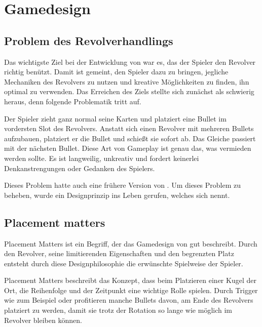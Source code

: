 
\section{Gamedesign}\label{sec:Gamedesign}

\renewcommand{\kapitelautor}{Autor: Philip Jankovic}


\subsection{Problem des Revolverhandlings}\label{subsec:gamedesignBehindBullets}

Das wichtigste Ziel bei der Entwicklung von \FF war es, das der Spieler den Revolver richtig benützt. Damit ist gemeint,
den Spieler dazu zu bringen, jegliche Mechaniken des Revolvers zu nutzen und kreative Möglichkeiten zu finden, ihn optimal zu verwenden.
Das Erreichen des Ziels stellte sich zunächst als schwierig heraus, denn folgende Problematik tritt auf.


Der Spieler zieht ganz normal seine Karten und platziert eine Bullet im vordersten Slot des Revolvers.
Anstatt sich einen Revolver mit mehreren Bullets aufzubauen, platziert er die Bullet und schießt sie sofort ab.
Das Gleiche passiert mit der nächsten Bullet. Diese Art von Gameplay ist genau das, was vermieden werden sollte.
Es ist langweilig, unkreativ und fordert keinerlei Denkanstrengungen oder Gedanken des Spielers.


Dieses Problem hatte auch eine frühere Version von \FF. Um dieses Problem zu beheben, wurde ein Designprinzip
ins Leben gerufen, welches sich  nennt.


\subsection{Placement matters}\label{subsec:placementMatters}

Placement Matters ist ein Begriff, der das Gamedesign von \FF gut beschreibt. Durch den Revolver, seine limitierenden
Eigenschaften und den begrenzten Platz entsteht durch diese Designphilosophie die erwünschte Spielweise der Spieler.

Placement Matters beschreibt das Konzept, dass beim Platzieren einer Kugel der Ort, die Reihenfolge und der Zeitpunkt
eine wichtige Rolle spielen. Durch Trigger wie zum Beispiel  oder  profitieren manche Bullets davon,
am Ende des Revolvers platziert zu werden, damit sie trotz der Rotation so lange wie möglich im Revolver bleiben können.


